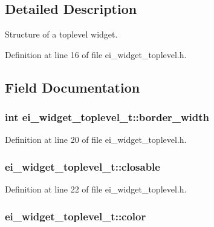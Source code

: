 \subsection{Detailed Description}
Structure of a toplevel widget. 

Definition at line 16 of file ei\-\_\-widget\-\_\-toplevel.\-h.



\subsection{Field Documentation}
\hypertarget{structei__widget__toplevel__t_ac3487d8274c78d4bb79a34d98d54f86e}{
\subsubsection[{border\-\_\-width}]{\setlength{\rightskip}{0pt plus 5cm}int ei\-\_\-widget\-\_\-toplevel\-\_\-t\-::border\-\_\-width}}\label{structei__widget__toplevel__t_ac3487d8274c78d4bb79a34d98d54f86e}


Definition at line 20 of file ei\-\_\-widget\-\_\-toplevel.\-h.

\hypertarget{structei__widget__toplevel__t_a3e8fb2c934a21fd631ddbe2c8ff272db}{
\subsubsection[{closable}]{ ei\-\_\-widget\-\_\-toplevel\-\_\-t\-::closable}}\label{structei__widget__toplevel__t_a3e8fb2c934a21fd631ddbe2c8ff272db}


Definition at line 22 of file ei\-\_\-widget\-\_\-toplevel.\-h.

\hypertarget{structei__widget__toplevel__t_a4004d31b3b9d5e6a2f80bca288c1c31b}{
\subsubsection[{color}]{ ei\-\_\-widget\-\_\-toplevel\-\_\-t\-::color}}\label{structei__widget__toplevel__t_a4004d31b3b9d5e6a2f80bca288c1c31b}



